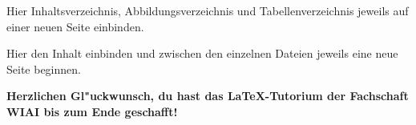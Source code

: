 
%



%

\setcounter{page}{2}

Hier Inhaltsverzeichnis, Abbildungsverzeichnis und Tabellenverzeichnis jeweils auf einer neuen Seite einbinden.


\setcounter{page}{1}

Hier den Inhalt einbinden und zwischen den einzelnen Dateien jeweils eine neue Seite beginnen.



\textbf{Herzlichen Gl"uckwunsch, du hast das \LaTeX -Tutorium der Fachschaft WIAI bis zum Ende geschafft!}

